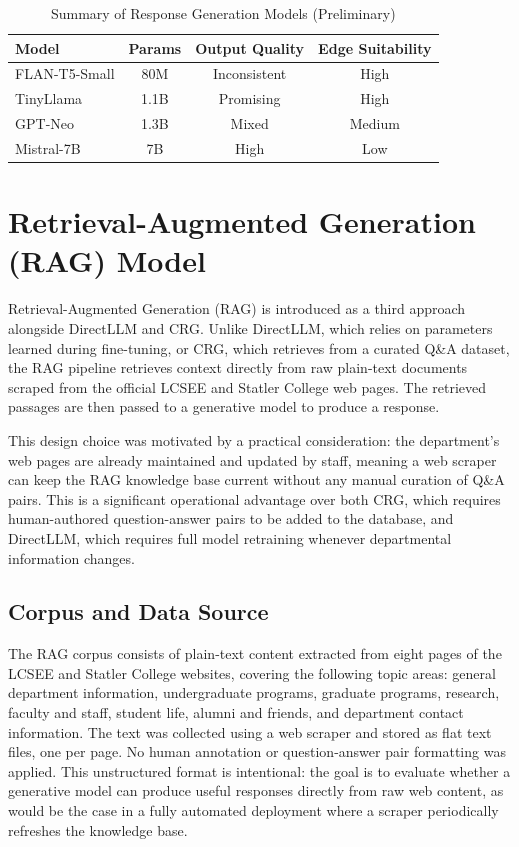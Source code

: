 \documentclass[conference]{IEEEtran}
\begin{document}
\begin{table}[h]
    \centering
    \caption{Summary of Response Generation Models (Preliminary)}
    \begin{tabular}{l|c|c|c}
    \hline
    \textbf{Model} & \textbf{Params} & \textbf{Output Quality} & \textbf{Edge Suitability} \\
    \hline
    FLAN-T5-Small & 80M & Inconsistent & High  \\
    TinyLlama & 1.1B & Promising & High  \\
    GPT-Neo & 1.3B & Mixed & Medium  \\
    Mistral-7B & 7B & High & Low  \\
    \hline
    \end{tabular}
    \label{tab:generation_models}
\end{table}

\section{Retrieval-Augmented Generation (RAG) Model}
Retrieval-Augmented Generation (RAG) is introduced as a third approach alongside DirectLLM and CRG.
Unlike DirectLLM, which relies on parameters learned during fine-tuning, or CRG, which retrieves from a curated Q\&A dataset, the RAG pipeline retrieves context directly from raw plain-text documents scraped from the official LCSEE and Statler College web pages.
The retrieved passages are then passed to a generative model to produce a response.

This design choice was motivated by a practical consideration: the department's web pages are already maintained and updated by staff, meaning a web scraper can keep the RAG knowledge base current without any manual curation of Q\&A pairs.
This is a significant operational advantage over both CRG, which requires human-authored question-answer pairs to be added to the database, and DirectLLM, which requires full model retraining whenever departmental information changes.

\subsection{Corpus and Data Source}
The RAG corpus consists of plain-text content extracted from eight pages of the LCSEE and Statler College websites, covering the following topic areas: general department information, undergraduate programs, graduate programs, research, faculty and staff, student life, alumni and friends, and department contact information.
The text was collected using a web scraper and stored as flat text files, one per page.
No human annotation or question-answer pair formatting was applied.
This unstructured format is intentional: the goal is to evaluate whether a generative model can produce useful responses directly from raw web content, as would be the case in a fully automated deployment where a scraper periodically refreshes the knowledge base.
\end{document}
